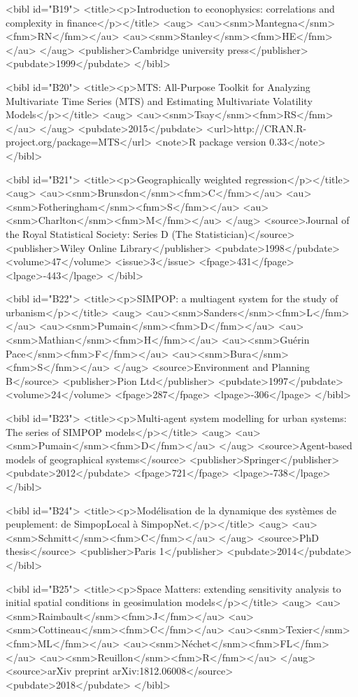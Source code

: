 \documentclass{article}
\begin{document}
{<bibl id="B19">
  <title><p>Introduction to econophysics: correlations and complexity in
  finance</p></title>
  <aug>
    <au><snm>Mantegna</snm><fnm>RN</fnm></au>
    <au><snm>Stanley</snm><fnm>HE</fnm></au>
  </aug>
  <publisher>Cambridge university press</publisher>
  <pubdate>1999</pubdate>
</bibl>

<bibl id="B20">
  <title><p>MTS: All-Purpose Toolkit for Analyzing Multivariate Time Series
  (MTS) and Estimating Multivariate Volatility Models</p></title>
  <aug>
    <au><snm>Tsay</snm><fnm>RS</fnm></au>
  </aug>
  <pubdate>2015</pubdate>
  <url>http://CRAN.R-project.org/package=MTS</url>
  <note>R package version 0.33</note>
</bibl>

<bibl id="B21">
  <title><p>Geographically weighted regression</p></title>
  <aug>
    <au><snm>Brunsdon</snm><fnm>C</fnm></au>
    <au><snm>Fotheringham</snm><fnm>S</fnm></au>
    <au><snm>Charlton</snm><fnm>M</fnm></au>
  </aug>
  <source>Journal of the Royal Statistical Society: Series D (The
  Statistician)</source>
  <publisher>Wiley Online Library</publisher>
  <pubdate>1998</pubdate>
  <volume>47</volume>
  <issue>3</issue>
  <fpage>431</fpage>
  <lpage>-443</lpage>
</bibl>

<bibl id="B22">
  <title><p>SIMPOP: a multiagent system for the study of urbanism</p></title>
  <aug>
    <au><snm>Sanders</snm><fnm>L</fnm></au>
    <au><snm>Pumain</snm><fnm>D</fnm></au>
    <au><snm>Mathian</snm><fnm>H</fnm></au>
    <au><snm>Gu{\'e}rin Pace</snm><fnm>F</fnm></au>
    <au><snm>Bura</snm><fnm>S</fnm></au>
  </aug>
  <source>Environment and Planning B</source>
  <publisher>Pion Ltd</publisher>
  <pubdate>1997</pubdate>
  <volume>24</volume>
  <fpage>287</fpage>
  <lpage>-306</lpage>
</bibl>

<bibl id="B23">
  <title><p>Multi-agent system modelling for urban systems: The series of
  SIMPOP models</p></title>
  <aug>
    <au><snm>Pumain</snm><fnm>D</fnm></au>
  </aug>
  <source>Agent-based models of geographical systems</source>
  <publisher>Springer</publisher>
  <pubdate>2012</pubdate>
  <fpage>721</fpage>
  <lpage>-738</lpage>
</bibl>

<bibl id="B24">
  <title><p>Mod{\'e}lisation de la dynamique des syst{\`e}mes de peuplement: de
  SimpopLocal {\`a} SimpopNet.</p></title>
  <aug>
    <au><snm>Schmitt</snm><fnm>C</fnm></au>
  </aug>
  <source>PhD thesis</source>
  <publisher>Paris 1</publisher>
  <pubdate>2014</pubdate>
</bibl>

<bibl id="B25">
  <title><p>Space Matters: extending sensitivity analysis to initial spatial
  conditions in geosimulation models</p></title>
  <aug>
    <au><snm>Raimbault</snm><fnm>J</fnm></au>
    <au><snm>Cottineau</snm><fnm>C</fnm></au>
    <au><snm>Texier</snm><fnm>ML</fnm></au>
    <au><snm>N{\'e}chet</snm><fnm>FL</fnm></au>
    <au><snm>Reuillon</snm><fnm>R</fnm></au>
  </aug>
  <source>arXiv preprint arXiv:1812.06008</source>
  <pubdate>2018</pubdate>
</bibl>

}
\end{document}
